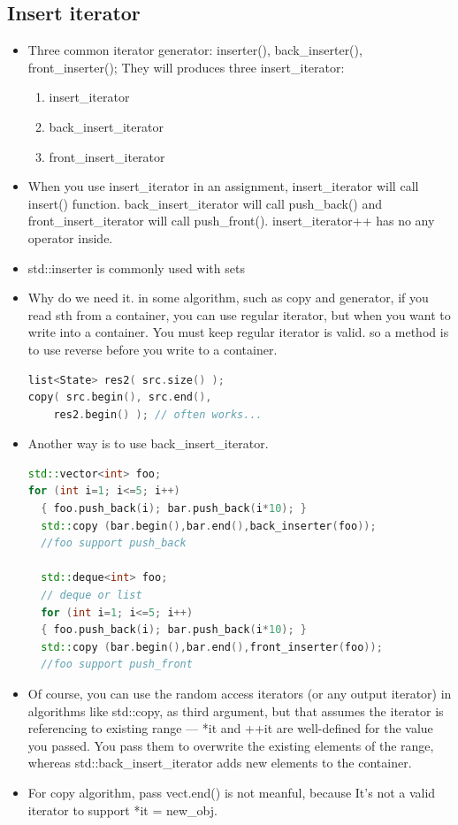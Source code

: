 \documentclass[a4paper,11pt,twoside]{book}
\begin{document}
\subsection{Insert iterator}
\begin{itemize}
\item Three common iterator generator: inserter(), back\_inserter(), front\_inserter();  They will produces three insert\_iterator:
\begin{enumerate}
	\item insert\_iterator
	\item back\_insert\_iterator
	\item front\_insert\_iterator
\end{enumerate}

\item When you use insert\_iterator in an assignment, insert\_iterator will call insert() function.  back\_insert\_iterator will call push\_back() and front\_insert\_iterator will call push\_front(). insert\_iterator++ has no any operator inside.

\item  std::inserter is commonly used with sets

\item Why do we need it. in some algorithm, such as copy and generator, if you read sth from a container, you can use regular iterator, but when you want to write into a container.  You must keep regular iterator is valid. so a method is to use reverse before you write to a container.

\begin{lstlisting}[frame=single, language=c++]
list<State> res2( src.size() );
copy( src.begin(), src.end(),
    res2.begin() ); // often works...
\end{lstlisting}

\item Another way is to use back\_insert\_iterator.
\begin{lstlisting}[frame=single, language=c++]
std::vector<int> foo;
for (int i=1; i<=5; i++)
  { foo.push_back(i); bar.push_back(i*10); }
  std::copy (bar.begin(),bar.end(),back_inserter(foo));
  //foo support push_back

  std::deque<int> foo;
  // deque or list
  for (int i=1; i<=5; i++)
  { foo.push_back(i); bar.push_back(i*10); }
  std::copy (bar.begin(),bar.end(),front_inserter(foo));
  //foo support push_front
\end{lstlisting}

\item Of course, you can use the random access iterators (or any output iterator) in algorithms like std::copy, as third argument, but that assumes the iterator is referencing to existing range — *it and ++it are well-defined for the value you passed. You pass them to overwrite the existing elements of the range, whereas std::back\_insert\_iterator adds new elements to the container.

\item For copy algorithm, pass vect.end() is not meanful, because It's not a valid iterator to support *it = new\_obj.

\end{itemize}
\end{document}

